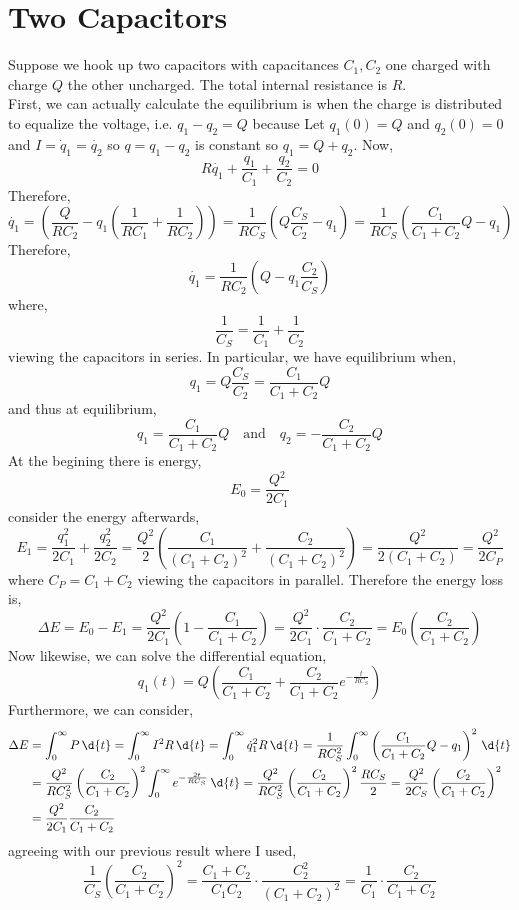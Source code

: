 \documentclass[12pt]{article}
\begin{document}
\section{Two Capacitors}

Suppose we hook up two capacitors with capacitances $C_1, C_2$ one charged with charge $Q$ the other uncharged. The total internal resistance is $R$.
\bigskip\\
First, we can actually calculate the equilibrium is when the charge is distributed to equalize the voltage, i.e. $q_1 - q_2 = Q$ because 
Let $q_1(0)  = Q$ and $q_2(0) = 0$ and $I = \dot{q}_1 = \dot{q_2}$ so $q = q_1 - q_2$ is constant so $q_1 = Q + q_2$. Now,
\[ R \dot{q_1} + \frac{q_1}{C_1} + \frac{q_2}{C_2} = 0 \]
Therefore,
\[ \dot{q_1} = \left( \frac{Q}{R C_2} - q_1 \left( \frac{1}{R C_1} + \frac{1}{R C_2} \right) \right) = \frac{1}{R C_S} \left( Q \frac{C_S}{C_2} - q_1 \right) = \frac{1}{R C_S} \left( \frac{C_1}{C_1 + C_2} Q - q_1 \right) \]
Therefore,
\[ \dot{q_1} = \frac{1}{R C_2} \left(Q  - q_1 \frac{C_2}{C_S} \right) \]
where,
\[ \frac{1}{C_S} = \frac{1}{C_1} + \frac{1}{C_2} \]
viewing the capacitors in series. In particular, we have equilibrium when, 
\[ q_1 = Q \frac{C_S}{C_2} = \frac{C_1}{C_1 + C_2} Q \]
and thus at equilibrium,
\[ q_1 = \frac{C_1}{C_1 + C_2} Q \quad \text{and} \quad q_2 = - \frac{C_2}{C_1 + C_2} Q \]
At the begining there is energy,
\[ E_0 = \frac{Q^2}{2 C_1} \]
consider the energy afterwards,
\[ E_1 = \frac{q_1^2}{2 C_1} + \frac{q_2^2}{2 C_2} = \frac{Q^2}{2} \left( \frac{C_1}{(C_1 + C_2)^2} + \frac{C_2}{(C_1 + C_2)^2} \right) = \frac{Q^2}{2 (C_1 + C_2)} = \frac{Q^2}{2 C_P} \]
where $C_P = C_1 + C_2$ viewing the capacitors in parallel. Therefore the energy loss is,
\[ \Delta E = E_0 - E_1 = \frac{Q^2}{2 C_1} \left( 1 - \frac{C_1}{C_1 + C_2} \right) = \frac{Q^2}{2C_1} \cdot \frac{C_2}{C_1 + C_2} = E_0 \left( \frac{C_2}{C_1 + C_2} \right) \] 
Now likewise, we can solve the differential equation,
\[ q_1(t) = Q \left( \frac{C_1}{C_1 + C_2} +  \frac{C_2}{C_1 + C_2} e^{- \frac{t}{RC_S}} \right) \]
Furthermore, we can consider,
\begin{align*}
\Delta E & = \int_0^{\infty} P \, \d{t} = \int_0^{\infty} I^2 R \, \d{t} = \int_0^{\infty} \dot{q}_1^2 R \, \d{t} = \frac{1}{R C_S^2} \int_0^{\infty} \left( \frac{C_1}{C_1 + C_2} Q - q_1 \right)^2 \, \d{t}
\\
& = \frac{Q^2}{R C_S^2} \left( \frac{C_2}{C_1 + C_2} \right)^2 \int_0^\infty e^{-\frac{2 t}{R C_S}} \, \d{t} = \frac{Q^2}{R C_S^2} \left( \frac{C_2}{C_1 + C_2} \right)^2 \frac{R C_S}{2} = \frac{Q^2}{2 C_S} \left( \frac{C_2}{C_1 + C_2} \right)^2
\\
& = \frac{Q^2}{2 C_1} \frac{C_2}{C_1 + C_2} 
\end{align*}
agreeing with our previous result where I used,
\[ \frac{1}{C_S} \left( \frac{C_2}{C_1 + C_2} \right)^2 = \frac{C_1 + C_2}{C_1 C_2} \cdot \frac{C_2^2}{(C_1 + C_2)^2} = \frac{1}{C_1} \cdot \frac{C_2}{C_1 + C_2} \]
\end{document}
